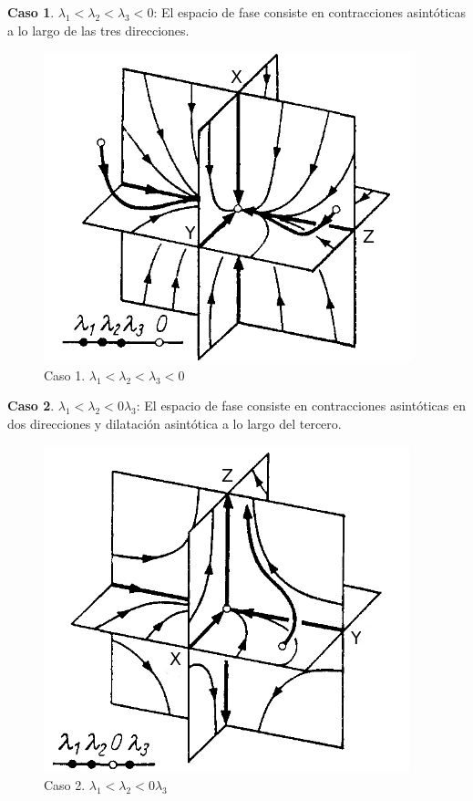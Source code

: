\documentclass[a4paper,10pt]{article}
\numberwithin{equation}{section}
\begin{document}
\textbf{Caso 1}. $\lambda_1 < \lambda_2 < \lambda_3 < 0$: El espacio de fase consiste en contracciones asintóticas
a lo largo de las tres direcciones.

\begin{figure}[H]
 \centering
\includegraphics[scale=0.35]{problema3fig2}
\caption{Caso 1. $\lambda_1 < \lambda_2 < \lambda_3 < 0$}
\label{fig:problema3fig2}
\end{figure}
\vspace{.3cm}

\newpage

\textbf{Caso 2}. $\lambda_1 < \lambda_2 < 0 \lambda_3$: El espacio de fase consiste en contracciones asintóticas
en dos direcciones y dilatación asintótica a lo largo del tercero.

\begin{figure}[H]
 \centering
\includegraphics[scale=0.35]{problema3fig3}
\caption{Caso 2. $\lambda_1 < \lambda_2 < 0 \lambda_3$}
\label{fig:problema3fig3}
\end{figure}
\vspace{.3cm}
\end{document}
